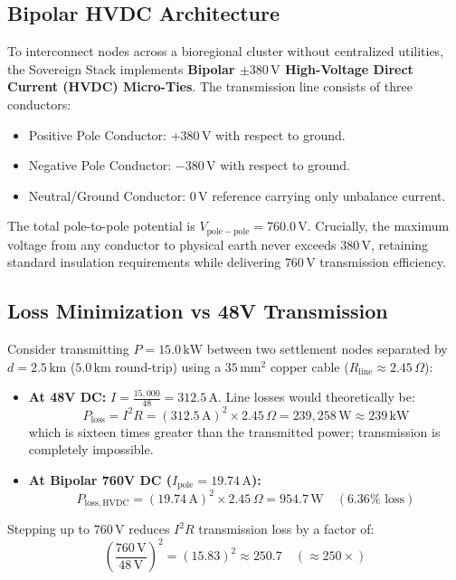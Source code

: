 \subsection{Bipolar HVDC Architecture}
To interconnect nodes across a bioregional cluster without centralized utilities, the Sovereign Stack implements \textbf{Bipolar $\pm 380\,\mathrm{V}$ High-Voltage Direct Current (HVDC) Micro-Ties}. The transmission line consists of three conductors:
\begin{itemize}
    \item Positive Pole Conductor: $+380\,\mathrm{V}$ with respect to ground.
    \item Negative Pole Conductor: $-380\,\mathrm{V}$ with respect to ground.
    \item Neutral/Ground Conductor: $0\,\mathrm{V}$ reference carrying only unbalance current.
\end{itemize}
The total pole-to-pole potential is $V_{\mathrm{pole-pole}} = 760.0\,\mathrm{V}$. Crucially, the maximum voltage from any conductor to physical earth never exceeds $380\,\mathrm{V}$, retaining standard insulation requirements while delivering $760\,\mathrm{V}$ transmission efficiency.

\subsection{Loss Minimization vs 48V Transmission}
Consider transmitting $P = 15.0\,\mathrm{kW}$ between two settlement nodes separated by $d = 2.5\,\mathrm{km}$ ($5.0\,\mathrm{km}$ round-trip) using a $35\,\mathrm{mm^2}$ copper cable ($R_{\mathrm{line}} \approx 2.45\,\Omega$):
\begin{itemize}
    \item \textbf{At 48V DC:} $I = \frac{15,000}{48} = 312.5\,\mathrm{A}$. Line losses would theoretically be:
    \begin{equation}
    P_{\mathrm{loss}} = I^2 R = (312.5\,\mathrm{A})^2 \times 2.45\,\Omega = 239,258\,\mathrm{W} \approx 239\,\mathrm{kW}
    \label{eq:hvdc_48v_absurdity}
    \end{equation}
    which is sixteen times greater than the transmitted power; transmission is completely impossible.
    \item \textbf{At Bipolar 760V DC ($I_{\mathrm{pole}} = 19.74\,\mathrm{A}$):}
    \begin{equation}
    P_{\mathrm{loss, HVDC}} = (19.74\,\mathrm{A})^2 \times 2.45\,\Omega = 954.7\,\mathrm{W} \quad (6.36\%\text{ loss})
    \label{eq:hvdc_loss_actual}
    \end{equation}
\end{itemize}
Stepping up to $760\,\mathrm{V}$ reduces $I^2 R$ transmission loss by a factor of:
\begin{equation}
\left( \frac{760\,\mathrm{V}}{48\,\mathrm{V}} \right)^2 = (15.83)^2 \approx 250.7 \quad (\approx 250\times)
\label{eq:hvdc_loss_reduction}
\end{equation}

